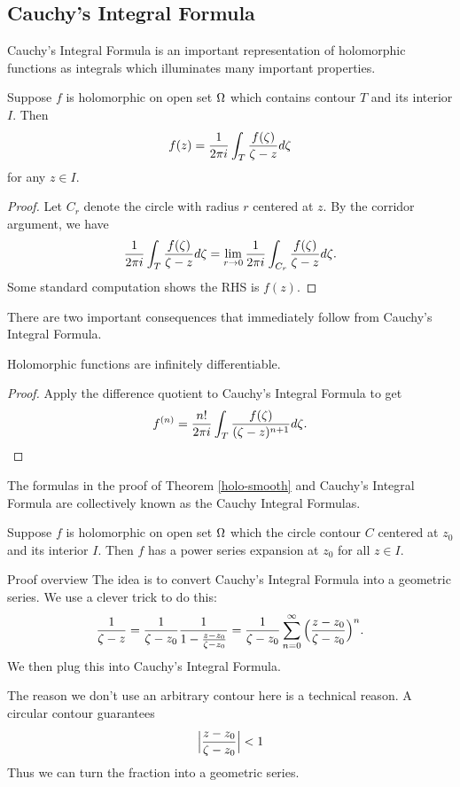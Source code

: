 \subsection{Cauchy's Integral Formula}
Cauchy's Integral Formula is an important representation of holomorphic functions as integrals which illuminates many important properties.
\begin{thm}
    Suppose $f$ is holomorphic on open set $\Omega$ which contains contour $T$ and its interior $I$. Then
    \[
        f(z) = \frac{1}{2\pi i}\int_T \frac{f(\zeta)}{\zeta - z}d\zeta
    \]
    for any $z \in I$.
\end{thm}
\begin{proof}
    Let $C_r$ denote the circle with radius $r$ centered at $z$. By the corridor argument, we have
    \[
        \frac{1}{2\pi i}\int_T \frac{f(\zeta)}{\zeta - z}d\zeta
        =
        \lim_{r \rightarrow 0} \frac{1}{2\pi i}\int_{C_r} \frac{f(\zeta)}{\zeta - z}d\zeta.
    \]
    Some standard computation shows the RHS is $f(z)$.
\end{proof}
There are two important consequences that immediately follow from Cauchy's Integral Formula.
\begin{thm}
    \label{holo-smooth}
    Holomorphic functions are infinitely differentiable.
\end{thm}
\begin{proof}
    Apply the difference quotient to Cauchy's Integral Formula to get
    \[
        f^{(n)} = \frac{n!}{2\pi i}\int_T \frac{f(\zeta)}{(\zeta-z)^{n+1}}d\zeta.
    \]
\end{proof}
\begin{remark}
    The formulas in the proof of Theorem \ref{holo-smooth} and Cauchy's Integral Formula are collectively known as the Cauchy Integral Formulas.
\end{remark}
\begin{thm}
    Suppose $f$ is holomorphic on open set $\Omega$ which the circle contour $C$ centered at $z_0$ and its interior $I$. Then $f$ has a power series expansion at $z_0$ for all $z \in I$.
\end{thm}
\begin{details}{Proof overview}
    The idea is to convert Cauchy's Integral Formula into a geometric series. We use a clever trick to do this:
    \[
        \frac{1}{\zeta-z} = \frac{1}{\zeta -z_0} \frac{1}{1 - \frac{z-z_0}{\zeta-z_0}} = \frac{1}{\zeta-z_0}\sum_{n=0}^\infty \Big( \frac{z-z_0}{\zeta-z_0} \Big)^n.
    \]
    We then plug this into Cauchy's Integral Formula.
\end{details}
\begin{remark}
    The reason we don't use an arbitrary contour here is a technical reason. A circular contour guarantees
    \[
        \Big| \frac{z - z_0}{\zeta - z_0} \Big| < 1
    \]
    Thus we can turn the fraction into a geometric series.
\end{remark}
